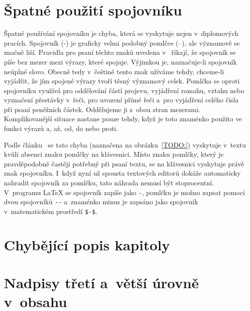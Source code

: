 \section{Špatné použití spojovníku}
Špatné používání spojovníku je chyba, která se vyskytuje nejen v~diplomových
pracích. Spojovník (-) je graficky velmi podobný pomlčce (--), ale významově
se značně liší. Pravidla pro psaní těchto znaků uvedena v~\cite{Ustav_pro_jazyk_cesky}
říkají, že spojovník se píše bez mezer mezi výrazy, které spojuje. Výjimkou
je, naznačuje-li spojovník neúplné slovo. Obecně tedy v~češtině tento znak
užíváme tehdy, chceme-li vyjádřit, že jím spojené výrazy tvoří těsný významový
celek. Pomlčka se oproti spojovníku využívá pro oddělování částí projevu,
vyjádření rozsahu, vztahu nebo vyznačení přestávky v~řeči, pro uvození
přímé řeči a~pro vyjádření celého čísla při psaní peněžních částek.
Oddělujeme ji z~obou stran mezerami. Komplikovanější situace nastane pouze
tehdy, když je toto znaménko použito ve funkci výrazů a, až, od, do nebo proti.

Podle článku~\cite{Zaklady_typografie:Slezakova} se tato chyba (naznačena na
obrázku~\ref{TODO:}) vyskytuje v~textu kvůli absenci znaku pomlčky na klávesnici.
Místo znaku pomlčky, který je pravděpodobně častěji potřebný při psaní textu,
se na klávesnici vyskytuje právě znak spojovníku. I~když nyní už spousta
textových editorů dokáže automaticky nahradit spojovník za pomlčku, tato náhrada
nemusí být stoprocentní. V~programu {\LaTeX} se spojovník zapíše jako \verb|-|,
pomlčku je možno zapsat pomocí dvou spojovníků \verb|--| a~znaménko minus je zapsáno
jako spojovník v~matematickém prostředí \verb|$-$|.



\section{Chybějící popis kapitoly}
\cite{Chlubna}
\dummyShortText[10]


\section{Nadpisy třetí a~větší úrovně v~obsahu}
\dummyShortText[10]


